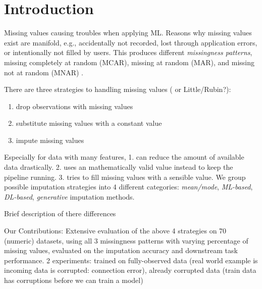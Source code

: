\section{Introduction}


Missing values causing troubles when applying ML. Reasons why missing values exist are manifold, e.g., accidentally not recorded, lost through application errors, or intentionally not filled by users. This produces different \emph{missingness patterns}, missing completely at random (MCAR), missing at random (MAR), and missing not at random (MNAR) \cite{Buuren}.

There are three strategies to handling missing values (\cite{Buuren} or Little/Rubin?):
\begin{enumerate}
	\item drop observations with missing values
	\item substitute missing values with a constant value
	\item impute missing values
\end{enumerate}

Especially for data with many features, 1. can reduce the amount of available data drastically. 2. uses an mathematically valid value instead to keep the pipeline running. 3. tries to fill missing values with a sensible value. We group possible imputation strategies into 4 different categories: \emph{mean/mode}, \emph{ML-based}, \emph{DL-based}, \emph{generative} imputation methods.

Brief description of there differences

Our Contributions: Extensive evaluation of the above 4 strategies on 70 (numeric) datasets, using all 3 missingness patterns with varying percentage of missing values, evaluated on the imputation accuracy and downstream task performance. 2 experiments: trained on fully-observed data (real world example is incoming data is corrupted: connection error), already corrupted data (train data has corruptions before we can train a model)
